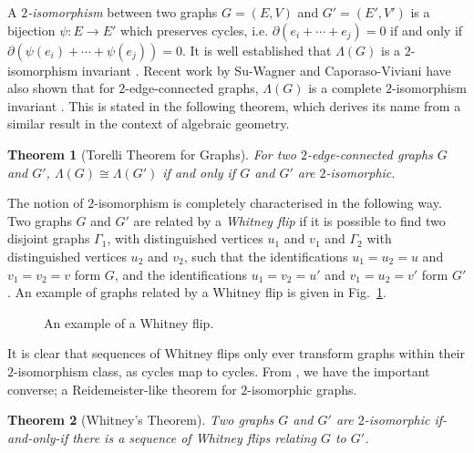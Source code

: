 \documentclass[12pt]{report}
\newtheorem*{theorem}{Theorem}
\theoremstyle{upright}
\begin{document}
A \textit{$2$-isomorphism} between two graphs $G = (E, V)$ and $G' = (E', V')$ is a bijection \({\psi: E \longrightarrow E'}\) which preserves cycles, i.e. $\partial(e_{i} + \cdots + e_{j}) = 0$ if and only if $\partial\left(\psi(e_{i}) + \cdots + \psi(e_{j})\right) = 0$. It is well established that $\Lambda(G)$ is a $2$-isomorphism invariant \parencite{lattice-of-flows-cuts}. Recent work by Su-Wagner and Caporaso-Viviani have also shown that for $2$-edge-connected graphs, $\Lambda(G)$ is a complete $2$-isomorphism invariant \cites[Theorem 3.1.1]{torelli-for-graphs-tropical-curves}[Theorem 1]{lattice-of-flows-regular-matroid}. This is stated in the following theorem, which derives its name from a similar result in the context of algebraic geometry.


\begin{theorem}[Torelli Theorem for Graphs]
For two $2$-edge-connected graphs $G$ and $G'$, $\Lambda(G) \cong \Lambda(G')$ if and only if $G$ and $G'$ are $2$-isomorphic.
\end{theorem}

The notion of $2$-isomorphism is completely characterised in the following way. Two graphs $G$ and $G'$ are related by a \textit{Whitney flip} if it is possible to find two disjoint graphs $\Gamma_{1}$, with distinguished vertices $u_{1}$ and $v_{1}$ and $\Gamma_{2}$ with distinguished vertices $u_{2}$ and $v_{2}$, such that the identifications $u_{1} = u_{2} = u$ and $v_{1} = v_{2} = v$ form $G$, and the identifications $u_{1} = v_{2} = u'$ and $v_{1} = u_{2} = v'$ form $G'$. An example of graphs related by a Whitney flip is given in Fig.~\ref{fig:whitney_flip}.

\begin{figure}[hbt!]
	\centering
	\def\svgscale{0.5}
	
	
	\caption{An example of a Whitney flip.}
	\label{fig:whitney_flip}
\end{figure}

It is clear that sequences of Whitney flips only ever transform graphs within their $2$-isomorphism class, as cycles map to cycles. From \cite{2-isomorphic-graphs}, we have the important converse; a Reidemeister-like theorem for $2$-isomorphic graphs.

\begin{theorem}[Whitney's Theorem]
Two graphs $G$ and $G'$ are $2$-isomorphic if-and-only-if there is a sequence of Whitney flips relating $G$ to $G'$.
\end{theorem}
\end{document}

